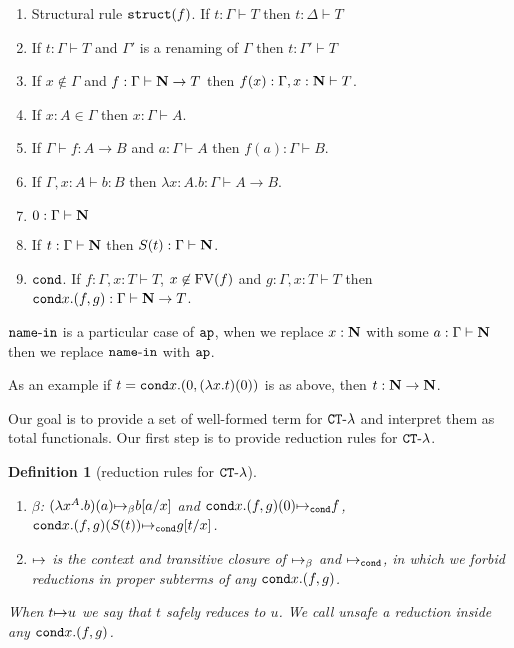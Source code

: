 \documentclass{article}
\newtheorem{definition}[theorem]{Definition}
\begin{document}
\begin{enumerate}
\item
Structural rule ${\tt struct}(f)$.
If $t: \Gamma \vdash T$ then $t:\Delta \vdash T$

\item
If $t:\Gamma \vdash T$ and $\Gamma'$ is a renaming of $\Gamma$ then
$t:\Gamma' \vdash T$

\item
If $x \not \in \Gamma$ and $f:\Gamma \vdash{\bf N} \rightarrow T$
then $f(x) : \Gamma, x:{\bf N} \vdash T$.

\item
If $x:A \in \Gamma$ then $x:\Gamma \vdash A$.

\item
If $\Gamma \vdash f:A \rightarrow B$ and $a:\Gamma \vdash A$ then $f(a) : \Gamma \vdash B$.

\item
If $\Gamma, x:A \vdash b: B$ then $\lambda x:A.b : \Gamma \vdash A \rightarrow B$.

\item
$0:\Gamma \vdash {\bf N}$

\item
If $t:\Gamma \vdash {\bf N}$ then $S(t):\Gamma \vdash {\bf N}$.

\item
${\tt cond}$. If $ f :\Gamma, x:T \vdash T$, $x \not \in {{\rm FV}}(f)$ and  $g : \Gamma, x:T \vdash T$
then ${\tt cond} x.(f,g) : \Gamma \vdash {\bf N} \rightarrow T$.
\end{enumerate}

${\tt name\mbox{-}in}$ is a particular case of ${\tt ap}$, when we replace $x:{\bf N}$ with some 
$a:\Gamma \vdash {\bf N}$  then we replace ${\tt name\mbox{-}in}$ with ${\tt ap}$.

As an example if $t = {\tt cond} x. (0,(\lambda x.t)(0))$ is as above, then $t:{\bf N} \rightarrow {\bf N}$.  

Our goal is to provide a set of well-formed term for ${ {\tt CT} \mbox{-} \lambda}$ and interpret them as total functionals. 
Our first step is to provide reduction rules for ${ {\tt CT} \mbox{-} \lambda}$.


\begin{definition}[reduction rules for ${ {\tt CT} \mbox{-} \lambda}$]
\mbox{}
\begin{enumerate}
\item
$\beta$: $(\lambda x^A.b)(a) {\mapsto}_\beta b[a/x]$ and ${\tt cond} x.(f,g)(0) {\mapsto}_{\tt cond} f$,
${\tt cond} x.(f,g)(S(t)) {\mapsto}_{\tt cond} g[t/x]$.

\item
${\mapsto}$ is the context and transitive closure of ${\mapsto}_\beta$ and ${\mapsto}_{\tt cond}$,
in which we forbid reductions in proper subterms of any ${\tt cond} x.(f,g)$. 

\end{enumerate}

When $t {\mapsto} u$ we say that $t$ \emph{safely reduces} to $u$.
We call \emph{unsafe} a reduction inside any ${\tt cond} x.(f,g)$.
\end{definition}
\end{document}
